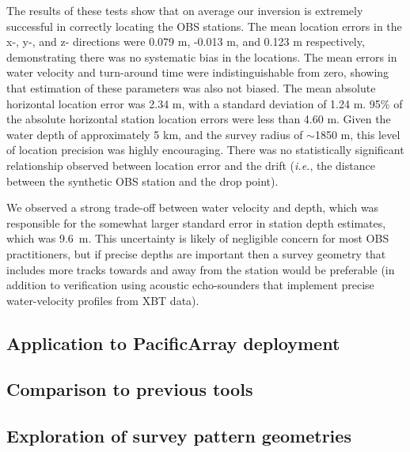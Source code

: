 The results of these tests show that on average our inversion is extremely successful in correctly locating the OBS stations. The mean location errors in the x-, y-, and z- directions were 0.079 m, -0.013 m, and 0.123 m respectively, demonstrating there was no systematic bias in the locations. The mean errors in water velocity and turn-around time were indistinguishable from zero, showing that estimation of these parameters was also not biased. The mean absolute horizontal location error was 2.34 m, with a standard deviation of 1.24 m. 95\% of the absolute horizontal station location errors were less than 4.60 m. Given the water depth of approximately 5 km, and the survey radius of $\sim$1850 m, this level of location precision was highly encouraging. There was no statistically significant relationship observed between location error and the drift (\textit{i.e.}, the distance between the synthetic OBS station and the drop point).

We observed a strong trade-off between water velocity and depth, which was responsible for the somewhat larger standard error in station depth estimates, which was \mbox{9.6 m}. This uncertainty is likely of negligible concern for most OBS practitioners, but if precise depths are important then a survey geometry that includes more tracks towards and away from the station would be preferable (in addition to verification using acoustic echo-sounders that implement precise water-velocity profiles from XBT data).

\subsection{Application to PacificArray deployment}

\subsection{Comparison to previous tools}

\subsection{Exploration of survey pattern geometries} \label{sec:surv_geom_tests}